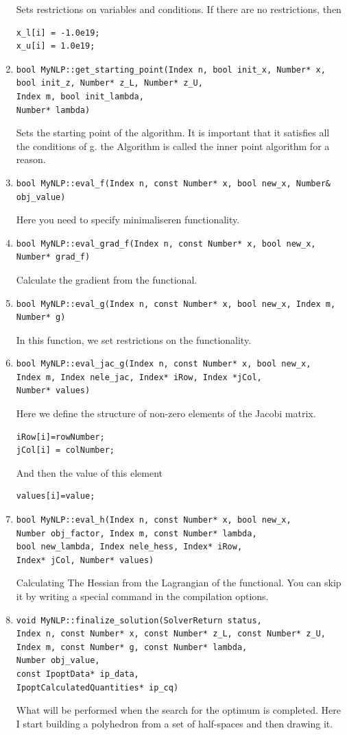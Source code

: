 \documentclass[11pt,fleqn,a4paper]{scrartcl}
\begin{document}
\begin{enumerate}
Sets restrictions on variables and conditions. If there are no restrictions, then
\begin{verbatim}
x_l[i] = -1.0e19;
x_u[i] = 1.0e19;
\end{verbatim}
\item
\begin{verbatim}
bool MyNLP::get_starting_point(Index n, bool init_x, Number* x,
bool init_z, Number* z_L, Number* z_U,
Index m, bool init_lambda,
Number* lambda)
\end{verbatim}
Sets the starting point of the algorithm. It is important that it satisfies all the conditions of g. the Algorithm is called the inner point algorithm for a reason.
\item
\begin{verbatim}
bool MyNLP::eval_f(Index n, const Number* x, bool new_x, Number& obj_value)
\end{verbatim}
Here you need to specify minimaliseren functionality.
\item
\begin{verbatim}
bool MyNLP::eval_grad_f(Index n, const Number* x, bool new_x, Number* grad_f)
\end{verbatim}
Calculate the gradient from the functional.
\item
\begin{verbatim}
bool MyNLP::eval_g(Index n, const Number* x, bool new_x, Index m, Number* g)
\end{verbatim}
In this function, we set restrictions on the functionality.
\item
\begin{verbatim}
bool MyNLP::eval_jac_g(Index n, const Number* x, bool new_x,
Index m, Index nele_jac, Index* iRow, Index *jCol,
Number* values)
\end{verbatim}
Here we define the structure of non-zero elements of the Jacobi matrix.
\begin{verbatim}
iRow[i]=rowNumber;
jCol[i] = colNumber;
\end{verbatim}
And then the value of this element
\begin{verbatim}
values[i]=value;
\end{verbatim}
\item
\begin{verbatim}
bool MyNLP::eval_h(Index n, const Number* x, bool new_x,
Number obj_factor, Index m, const Number* lambda,
bool new_lambda, Index nele_hess, Index* iRow,
Index* jCol, Number* values)
\end{verbatim}
Calculating The Hessian from the Lagrangian of the functional. You can skip it by writing a special command in the compilation options.
\item
\begin{verbatim}
void MyNLP::finalize_solution(SolverReturn status,
Index n, const Number* x, const Number* z_L, const Number* z_U,
Index m, const Number* g, const Number* lambda,
Number obj_value,
const IpoptData* ip_data,
IpoptCalculatedQuantities* ip_cq)
\end{verbatim}
What will be performed when the search for the optimum is completed. Here I start building a polyhedron from a set of half-spaces and then drawing it.
\end{enumerate}
\end{document}
